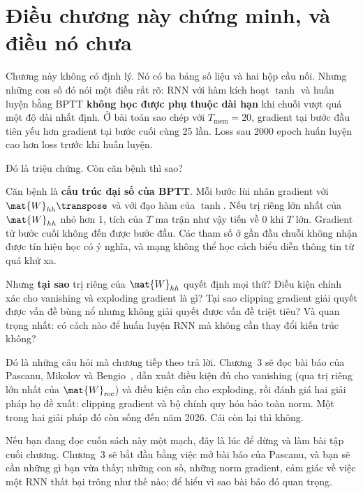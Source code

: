 %

\section{Điều chương này chứng minh, và điều nó chưa}
\label{sec:ch02-hinge}

Chương này không có định lý. Nó có ba bảng số liệu và hai hộp cầu nối. Nhưng
những con số đó nói một điều rất rõ: RNN với hàm kích hoạt $\tanh$ và huấn
luyện bằng BPTT \textbf{không học được phụ thuộc dài hạn} khi chuỗi vượt quá
một độ dài nhất định. Ở bài toán sao chép với $T_{\text{mem}} = 20$, gradient
tại bước đầu tiên yếu hơn gradient tại bước cuối cùng 25 lần. Loss sau 2000
epoch huấn luyện cao hơn loss trước khi huấn luyện.

Đó là triệu chứng. Còn căn bệnh thì sao?

Căn bệnh là \textbf{cấu trúc đại số của BPTT}. Mỗi bước lùi nhân gradient
với $\mat{W}_{hh}\transpose$ và với đạo hàm của $\tanh$. Nếu trị riêng lớn
nhất của $\mat{W}_{hh}$ nhỏ hơn 1, tích của $T$ ma trận như vậy tiến về 0
khi $T$ lớn. Gradient từ bước cuối không đến được bước đầu. Các tham số ở
gần đầu chuỗi không nhận được tín hiệu học có ý nghĩa, và mạng không thể
học cách biểu diễn thông tin từ quá khứ xa.

Nhưng \textbf{tại sao} trị riêng của $\mat{W}_{hh}$ quyết định mọi thứ?
Điều kiện chính xác cho vanishing và exploding gradient là gì? Tại sao
clipping gradient giải quyết được vấn đề bùng nổ nhưng không giải quyết
được vấn đề triệt tiêu? Và quan trọng nhất: có cách nào để huấn luyện RNN
mà không cần thay đổi kiến trúc không?

Đó là những câu hỏi mà chương tiếp theo trả lời. Chương~3 sẽ đọc bài báo
của Pascanu, Mikolov và Bengio~\autocite{pascanu2013difficulty}, dẫn xuất điều kiện
đủ cho vanishing (qua trị riêng lớn nhất của $\mat{W}_{\text{rec}}$) và điều
kiện cần cho exploding, rồi đánh giá hai giải pháp họ đề xuất: clipping
gradient và bộ chính quy hóa bảo toàn norm. Một trong hai giải pháp đó còn
sống đến năm 2026. Cái còn lại thì không.

Nếu bạn đang đọc cuốn sách này một mạch, đây là lúc để dừng và làm bài tập
cuối chương. Chương~3 sẽ bắt đầu bằng việc mở bài báo của Pascanu, và bạn
sẽ cần những gì bạn vừa thấy; những con số, những norm gradient, cảm giác
về việc một RNN thất bại trông như thế nào; để hiểu vì sao bài báo đó
quan trọng.
